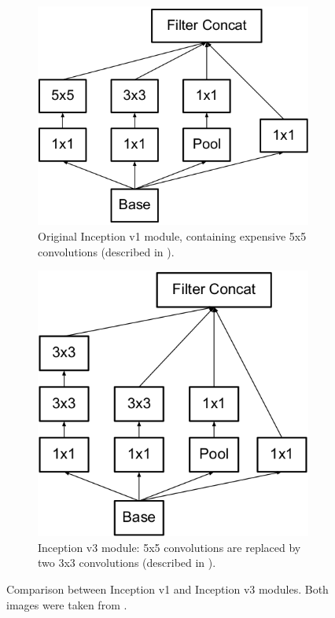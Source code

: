 \documentclass[12pt, twoside, a4paper]{report}
\begin{document}
\begin{figure}
\centering
\begin{subfigure}[b]{.49\linewidth}
\includegraphics[width=.95\linewidth]{images/paper-images/inception-v1.png}
\caption{Original Inception v1 module, containing expensive 5x5 convolutions (described in \cite{inception-v1}).}
\label{subfig:inception-v1}
\end{subfigure}
\begin{subfigure}[b]{.49\linewidth}
\includegraphics[width=.95\linewidth]{images/paper-images/inception-v3.png}
\caption{Inception v3 module: 5x5 convolutions are replaced by two 3x3 convolutions (described in \cite{inception-v3}).}
\label{subfig:inception-v3}
\end{subfigure}
\caption{Comparison between Inception v1 and Inception v3 modules. Both images were taken from \cite{inception-v3}.}
\label{fig:inception-versions}
\end{figure}
\bigskip
\end{document}
